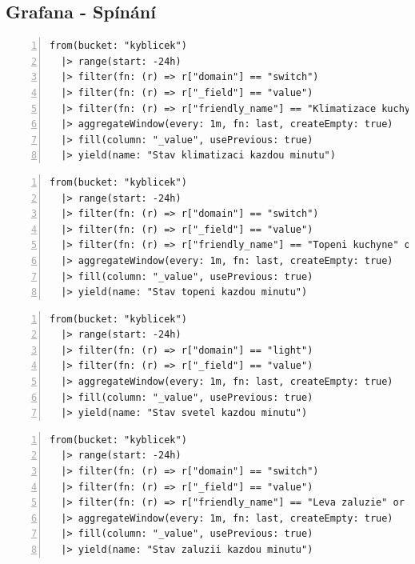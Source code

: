 \subsection{Grafana - Spínání}
\begin{lstlisting}[language=flux, breaklines=true, numbers=left, numberstyle=\small, numbersep=10pt, frame=single, basicstyle=\ttfamily\small, caption={Grafana - Spínání klimatizace}, label={lst:grafanaKlimatizace}]
from(bucket: "kyblicek")
  |> range(start: -24h)
  |> filter(fn: (r) => r["domain"] == "switch")
  |> filter(fn: (r) => r["_field"] == "value")
  |> filter(fn: (r) => r["friendly_name"] == "Klimatizace kuchyne" or r["friendly_name"] == "Klimatizace pracovna" or r["friendly_name"] == "Klimatizace u televize")
  |> aggregateWindow(every: 1m, fn: last, createEmpty: true)
  |> fill(column: "_value", usePrevious: true)
  |> yield(name: "Stav klimatizaci kazdou minutu")
\end{lstlisting}
\begin{lstlisting}[language=flux, breaklines=true, numbers=left, numberstyle=\small, numbersep=10pt, frame=single, basicstyle=\ttfamily\small, caption={Grafana - Spínání topení}, label={lst:grafanaTopeni}]
from(bucket: "kyblicek")
  |> range(start: -24h)
  |> filter(fn: (r) => r["domain"] == "switch")
  |> filter(fn: (r) => r["_field"] == "value")
  |> filter(fn: (r) => r["friendly_name"] == "Topeni kuchyne" or r["friendly_name"] == "Topeni pracovna" or r["friendly_name"] == "Topeni u televize")
  |> aggregateWindow(every: 1m, fn: last, createEmpty: true)
  |> fill(column: "_value", usePrevious: true)
  |> yield(name: "Stav topeni kazdou minutu")
\end{lstlisting}
\begin{lstlisting}[language=flux, breaklines=true, numbers=left, numberstyle=\small, numbersep=10pt, frame=single, basicstyle=\ttfamily\small, caption={Grafana - Spínání světel}, label={lst:grafanaSvetla}]
from(bucket: "kyblicek")
  |> range(start: -24h)
  |> filter(fn: (r) => r["domain"] == "light")
  |> filter(fn: (r) => r["_field"] == "value")
  |> aggregateWindow(every: 1m, fn: last, createEmpty: true)
  |> fill(column: "_value", usePrevious: true)
  |> yield(name: "Stav svetel kazdou minutu")
\end{lstlisting}
\pagebreak
\begin{lstlisting}[language=flux, breaklines=true, numbers=left, numberstyle=\small, numbersep=10pt, frame=single, basicstyle=\ttfamily\small, caption={Grafana - Spínání žaluzií}, label={lst:grafanaZaluzie}]
from(bucket: "kyblicek")
  |> range(start: -24h)
  |> filter(fn: (r) => r["domain"] == "switch")
  |> filter(fn: (r) => r["_field"] == "value")
  |> filter(fn: (r) => r["friendly_name"] == "Leva zaluzie" or r["friendly_name"] == "Prava zaluzie")
  |> aggregateWindow(every: 1m, fn: last, createEmpty: true)
  |> fill(column: "_value", usePrevious: true)
  |> yield(name: "Stav zaluzii kazdou minutu")
\end{lstlisting}
\pagebreak
